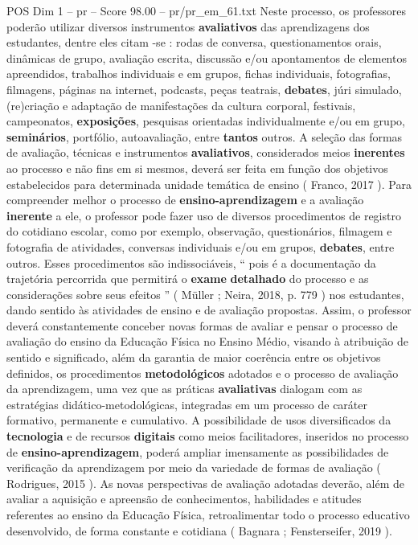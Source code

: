\begin{textsample}{POS Dim 1 – pr – Score 98.00 – pr/pr\_em\_61.txt}
Neste processo, os professores poderão utilizar diversos instrumentos \textbf{avaliativos} das aprendizagens dos estudantes, dentre eles citam -se : rodas de conversa, questionamentos orais, dinâmicas de grupo, avaliação escrita, discussão e/ou apontamentos de elementos apreendidos, trabalhos individuais e em grupos, fichas individuais, fotografias, filmagens, páginas na internet, podcasts, peças teatrais, \textbf{debates}, júri simulado, (re)criação e adaptação de manifestações da cultura corporal, festivais, campeonatos, \textbf{exposições}, pesquisas orientadas individualmente e/ou em grupo, \textbf{seminários}, portfólio, autoavaliação, entre \textbf{tantos} outros.
A seleção das formas de avaliação, técnicas e instrumentos \textbf{avaliativos}, considerados meios \textbf{inerentes} ao processo e não fins em si mesmos, deverá ser feita em função dos objetivos estabelecidos para determinada unidade temática de ensino ( Franco, 2017 ).
Para compreender melhor o processo de \textbf{ensino-aprendizagem} e a avaliação \textbf{inerente} a ele, o professor pode fazer uso de diversos procedimentos de registro do cotidiano escolar, como por exemplo, observação, questionários, filmagem e fotografia de atividades, conversas individuais e/ou em grupos, \textbf{debates}, entre outros.
Esses procedimentos são indissociáveis, “ pois é a documentação da trajetória percorrida que permitirá o \textbf{exame} \textbf{detalhado} do processo e as considerações sobre seus efeitos ” ( Müller ; Neira, 2018, p. 779 ) nos estudantes, dando sentido às atividades de ensino e de avaliação propostas.
Assim, o professor deverá constantemente conceber novas formas de avaliar e pensar o processo de avaliação do ensino da Educação Física no Ensino Médio, visando à atribuição de sentido e significado, além da garantia de maior coerência entre os objetivos definidos, os procedimentos \textbf{metodológicos} adotados e o processo de avaliação da aprendizagem, uma vez que as práticas \textbf{avaliativas} dialogam com as estratégias didático-metodológicas, integradas em um processo de caráter formativo, permanente e cumulativo.
A possibilidade de usos diversificados da \textbf{tecnologia} e de recursos \textbf{digitais} como meios facilitadores, inseridos no processo de \textbf{ensino-aprendizagem}, poderá ampliar imensamente as possibilidades de verificação da aprendizagem por meio da variedade de formas de avaliação ( Rodrigues, 2015 ).
As novas perspectivas de avaliação adotadas deverão, além de avaliar a aquisição e apreensão de conhecimentos, habilidades e atitudes referentes ao ensino da Educação Física, retroalimentar todo o processo educativo desenvolvido, de forma constante e cotidiana ( Bagnara ; Fensterseifer, 2019 ).

\end{textsample}
